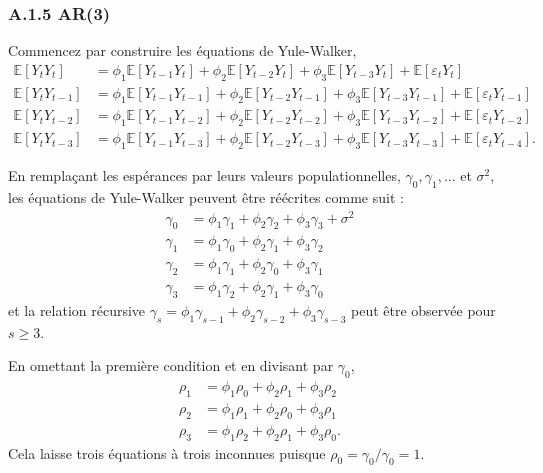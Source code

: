 \documentclass[
  letterpaper,
  DIV=11,
  numbers=noendperiod]{scrartcl}
\begin{document}
\subsubsection{A.1.5 AR(3)}\label{a.1.5-ar3}

Commencez par construire les équations de Yule-Walker, \[
\begin{aligned}
\mathbb{E}[Y_t Y_t] &= \phi_1 \mathbb{E}[Y_{t-1} Y_t] + \phi_2 \mathbb{E}[Y_{t-2} Y_t] + \phi_3 \mathbb{E}[Y_{t-3} Y_t] + \mathbb{E}[\varepsilon_t Y_t] \\
\mathbb{E}[Y_t Y_{t-1}] &= \phi_1 \mathbb{E}[Y_{t-1} Y_{t-1}] + \phi_2 \mathbb{E}[Y_{t-2} Y_{t-1}] + \phi_3 \mathbb{E}[Y_{t-3} Y_{t-1}] + \mathbb{E}[\varepsilon_t Y_{t-1}] \\
\mathbb{E}[Y_t Y_{t-2}] &= \phi_1 \mathbb{E}[Y_{t-1} Y_{t-2}] + \phi_2 \mathbb{E}[Y_{t-2} Y_{t-2}] + \phi_3 \mathbb{E}[Y_{t-3} Y_{t-2}] + \mathbb{E}[\varepsilon_t Y_{t-2}] \\
\mathbb{E}[Y_t Y_{t-3}] &= \phi_1 \mathbb{E}[Y_{t-1} Y_{t-3}] + \phi_2 \mathbb{E}[Y_{t-2} Y_{t-3}] + \phi_3 \mathbb{E}[Y_{t-3} Y_{t-3}] + \mathbb{E}[\varepsilon_t Y_{t-4}].
\end{aligned}
\]

En remplaçant les espérances par leurs valeurs populationnelles,
\(\gamma_0, \gamma_1, \dots\) et \(\sigma^2\), les équations de
Yule-Walker peuvent être réécrites comme suit : \[
\begin{aligned}
\gamma_0 &= \phi_1 \gamma_1 + \phi_2 \gamma_2 + \phi_3 \gamma_3 + \sigma^2 \\
\gamma_1 &= \phi_1 \gamma_0 + \phi_2 \gamma_1 + \phi_3 \gamma_2 \\
\gamma_2 &= \phi_1 \gamma_1 + \phi_2 \gamma_0 + \phi_3 \gamma_1 \\
\gamma_3 &= \phi_1 \gamma_2 + \phi_2 \gamma_1 + \phi_3 \gamma_0
\end{aligned}
\] et la relation récursive
\(\gamma_s = \phi_1 \gamma_{s-1} + \phi_2 \gamma_{s-2} + \phi_3 \gamma_{s-3}\)
peut être observée pour \(s \geq 3\).

En omettant la première condition et en divisant par \(\gamma_0\), \[
\begin{aligned}
\rho_1 &= \phi_1 \rho_0 + \phi_2 \rho_1 + \phi_3 \rho_2 \\
\rho_2 &= \phi_1 \rho_1 + \phi_2 \rho_0 + \phi_3 \rho_1 \\
\rho_3 &= \phi_1 \rho_2 + \phi_2 \rho_1 + \phi_3 \rho_0.
\end{aligned}
\] Cela laisse trois équations à trois inconnues puisque
\(\rho_0 = \gamma_0 / \gamma_0 = 1\).
\end{document}
